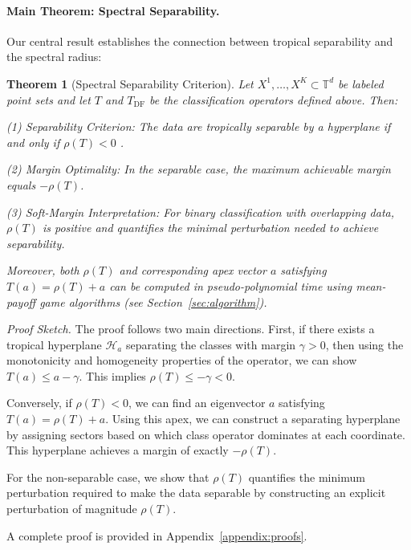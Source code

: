 \documentclass{article}
\newtheorem{theorem}{Theorem}
\newcommand{\trop}{\mathbb{T}}
\begin{document}
\paragraph{Main Theorem: Spectral Separability.}
Our central result establishes the connection between tropical separability and the spectral radius:

\begin{theorem}[Spectral Separability Criterion]\label{thm:spectral_separability}
Let $X^1,\ldots,X^K \subset \trop^d$ be labeled point sets and let $T$ and $T_{\text{DF}}$ be the classification operators defined above. Then:

(1) \textit{Separability Criterion:} The data are tropically separable by a hyperplane if and only if $\rho(T) < 0$ .

(2) \textit{Margin Optimality:} In the separable case, the maximum achievable margin equals $-\rho(T) $.

(3) \textit{Soft-Margin Interpretation:} For binary classification with overlapping data, $\rho(T)$ is positive and quantifies the minimal perturbation needed to achieve separability.

Moreover, both $\rho(T)$ and corresponding apex vector $a$ satisfying $T(a) = \rho(T)+a$ can be computed in pseudo-polynomial time using mean-payoff game algorithms (see Section~\ref{sec:algorithm}).
 
\end{theorem}


\emph{Proof Sketch.}
The proof follows two main directions. First, if there exists a tropical hyperplane $\mathcal{H}_a$ separating the classes with margin $\gamma>0$, then using the monotonicity and homogeneity properties of the operator, we can show $T(a) \leq a - \gamma$. This implies $\rho(T) \leq -\gamma < 0$.

Conversely, if $\rho(T)<0$, we can find an eigenvector $a$ satisfying $T(a)=\rho(T)+a$. Using this apex, we can construct a separating hyperplane by assigning sectors based on which class operator dominates at each coordinate. This hyperplane achieves a margin of exactly $-\rho(T)$.

For the non-separable case, we show that $\rho(T)$ quantifies the minimum perturbation required to make the data separable by constructing an explicit perturbation of magnitude $\rho(T)$.

A complete proof is provided in Appendix~\ref{appendix:proofs}.
\end{document}
